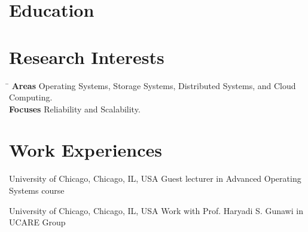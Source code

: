 \documentclass[10pt]{article} %
\begin{document}

\section{Education}





\section{Research Interests}

\begin{tabbing}
\hspace{2.5cm} \= \kill
\textbf{Areas} \> Operating Systems, Storage Systems, Distributed Systems, and Cloud Computing. \\
\textbf{Focuses} \> Reliability and Scalability.
\end{tabbing}


\section{Work Experiences}

{University of Chicago, Chicago, IL, USA}
{Guest lecturer in Advanced Operating Systems course} 

{University of Chicago, Chicago, IL, USA}
{Work with Prof. Haryadi S. Gunawi in UCARE Group} 
\end{document}
